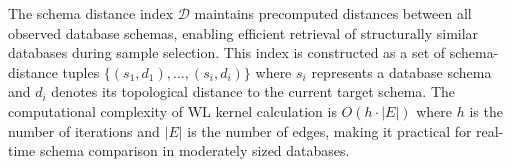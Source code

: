 The schema distance index $\mathcal{D}$ maintains precomputed distances between
all observed database schemas, enabling efficient retrieval of structurally similar
databases during sample selection. This index is constructed as a set of
schema-distance tuples $\{(s_1, d_1), \ldots, (s_i, d_i)\}$ where $s_i$ represents
a database schema and $d_i$ denotes its topological distance to the current target
schema. The computational complexity of WL kernel calculation is $O(h \cdot |E|)$
where $h$ is the number of iterations and $|E|$ is the number of edges, making
it practical for real-time schema comparison in moderately sized databases.

